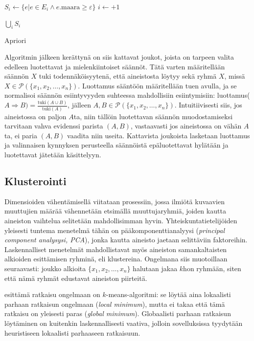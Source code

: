 \documentclass[finnish,gradu,twoside,12pt]{tktltiki}
\begin{document}
{\begin{algorithm}
\begin{algorithmic}
	\EndFor 

		\State $S_i \gets \{ e | e \in E_i \land e.\mathrm{maara} \geq \varepsilon \}$
		\State $i \gets +1$
\EndWhile

\Return $\bigcup_i S_i$
\end{algorithmic}
\caption{Apriori}
\label{algo:apriori}
\end{algorithm}

Algoritmin jälkeen kerättynä on siis kattavat joukot, joista on tarpeen valita edelleen luotettavat ja mielenkiintoiset säännöt. Tätä varten määritellään säännön $X$ tuki todennäköisyytenä, että aineistosta löytyy sekä ryhmä $X$, missä $X \in \mathcal{P}( \{ x_1, x_2, \ldots , x_n \} )$. Luottamus sääntöön määritellään tuen avulla, ja se normalisoi säännön esiintyvyyden suhteessa mahdollisiin esiintymisiin: luottamus($A \Rightarrow B) = \frac{ \mathrm{tuki}(A \cup B)}{ \mathrm{tuki}(A)}$, jälleen $A,B \in \mathcal{P}( \{ x_1, x_2, \ldots , x_n \} )$. Intuitiivisesti siis, jos aineistossa on paljon $A$ta, niin tällöin luotettavan säännön muodostamiseksi tarvitaan vahva evidenssi parista $(A,B)$, vastaavasti jos aineistossa on vähän $A$ta, ei paria $(A,B)$ vaadita niin useita. Kattavista joukoista lasketaan luottamus ja valinnaisen kynnyksen perusteella säännöistä epäluotettavat hylätään ja luotettavat jätetään käsittelyyn.

\subsection{Klusterointi}

Dimensioiden vähentämisellä viitataan prosessiin, jossa ilmiötä kuvaavien muuttujien määrää vähennetään etsimällä muuttujaryhmiä, joiden kautta aineiston vaihtelua selitetään mahdollisimman hyvin. Yhteiskuntatietelijöiden yleisesti tuntema menetelmä tähän on pääkomponenttianalyysi (\textit{principal component analysysi, PCA}), jonka kautta aineisto jaetaan selittäviin faktoreihin. Laskennalliset menetelmät mahdollistavat myös aineiston samankaltaisten alkioiden esittämisen ryhminä, eli klustereina. Ongelmana siis muotoillaan seuraavasti: joukko alkioita $\{ x_1, x_2, \ldots, x_n \}$ halutaan jakaa $k$hon ryhmään, siten että nämä ryhmät edustavat aineiston piirteitä.

\citet{llyod1982} esittämä ratkaisu ongelmaan on $k$-means-algoritmi: se löytää aina lokaalisti parhaan ratkaisun ongelmaan (\textit{local minimum}), mutta ei takaa että tämä ratkaisu on yleisesti paras (\textit{global minimum}). Globaalisti parhaan ratkaisun löytäminen on kuitenkin laskennallisesti vaativa, jolloin sovelluksissa tyydytään heuristiseen lokaalisti parhaaseen ratkaisuun.

}
\end{document}

